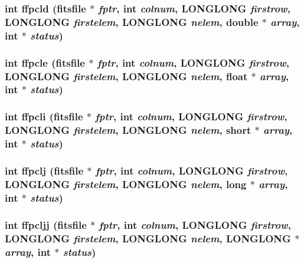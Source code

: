 \subsubsection{\setlength{\rightskip}{0pt plus 5cm}int ffpcld (\bf{fitsfile} $\ast$ {\em fptr}, int {\em colnum}, \bf{LONGLONG} {\em firstrow}, \bf{LONGLONG} {\em firstelem}, \bf{LONGLONG} {\em nelem}, double $\ast$ {\em array}, int $\ast$ {\em status})}\label{src_2fitsio_8h_19edb8890772979f20c6f6e5957b2ad1}


\subsubsection{\setlength{\rightskip}{0pt plus 5cm}int ffpcle (\bf{fitsfile} $\ast$ {\em fptr}, int {\em colnum}, \bf{LONGLONG} {\em firstrow}, \bf{LONGLONG} {\em firstelem}, \bf{LONGLONG} {\em nelem}, float $\ast$ {\em array}, int $\ast$ {\em status})}\label{src_2fitsio_8h_2af80b40c939d1d21b4da19e8999421c}


\subsubsection{\setlength{\rightskip}{0pt plus 5cm}int ffpcli (\bf{fitsfile} $\ast$ {\em fptr}, int {\em colnum}, \bf{LONGLONG} {\em firstrow}, \bf{LONGLONG} {\em firstelem}, \bf{LONGLONG} {\em nelem}, short $\ast$ {\em array}, int $\ast$ {\em status})}\label{src_2fitsio_8h_097003985cb9d02ceced5a5744bfa0fc}


\subsubsection{\setlength{\rightskip}{0pt plus 5cm}int ffpclj (\bf{fitsfile} $\ast$ {\em fptr}, int {\em colnum}, \bf{LONGLONG} {\em firstrow}, \bf{LONGLONG} {\em firstelem}, \bf{LONGLONG} {\em nelem}, long $\ast$ {\em array}, int $\ast$ {\em status})}\label{src_2fitsio_8h_5792d2cdff6869df24d96769d29588bb}


\subsubsection{\setlength{\rightskip}{0pt plus 5cm}int ffpcljj (\bf{fitsfile} $\ast$ {\em fptr}, int {\em colnum}, \bf{LONGLONG} {\em firstrow}, \bf{LONGLONG} {\em firstelem}, \bf{LONGLONG} {\em nelem}, \bf{LONGLONG} $\ast$ {\em array}, int $\ast$ {\em status})}\label{src_2fitsio_8h_65ee3dc7c6f9893ec471ba73d3a9779d}


